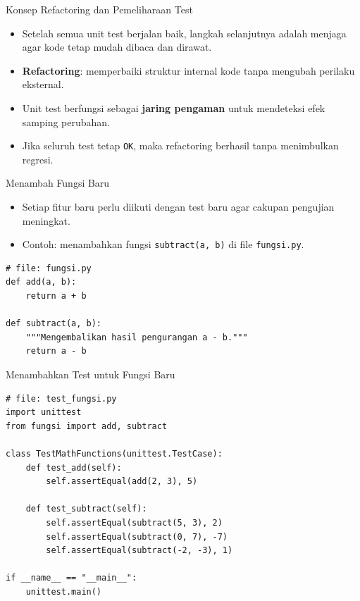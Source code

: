 \documentclass[aspectratio=169, table]{beamer}
\begin{document}
\begin{frame}[fragile]{Konsep Refactoring dan Pemeliharaan Test}
\vspace*{20pt}
\begin{itemize}
  \item Setelah semua unit test berjalan baik, langkah selanjutnya adalah menjaga agar kode tetap mudah dibaca dan dirawat.
  \item \textbf{Refactoring}: memperbaiki struktur internal kode tanpa mengubah perilaku eksternal.
  \item Unit test berfungsi sebagai \textbf{jaring pengaman} untuk mendeteksi efek samping perubahan.
  \item Jika seluruh test tetap \texttt{OK}, maka refactoring berhasil tanpa menimbulkan regresi.
\end{itemize}
\end{frame}

\begin{frame}[fragile]{Menambah Fungsi Baru}
\vspace*{20pt}
\begin{itemize}
  \item Setiap fitur baru perlu diikuti dengan test baru agar cakupan pengujian meningkat.
  \item Contoh: menambahkan fungsi \texttt{subtract(a, b)} di file \texttt{fungsi.py}.
\end{itemize}

\begin{lstlisting}[style=PythonStyle, caption={Fungsi baru: subtract()}]
# file: fungsi.py
def add(a, b):
    return a + b

def subtract(a, b):
    """Mengembalikan hasil pengurangan a - b."""
    return a - b
\end{lstlisting}
\end{frame}

\begin{frame}[fragile]{Menambahkan Test untuk Fungsi Baru}
\vspace*{20pt}
\begin{lstlisting}[style=PythonStyle, caption={Test untuk fungsi add() dan subtract()}]
# file: test_fungsi.py
import unittest
from fungsi import add, subtract

class TestMathFunctions(unittest.TestCase):
    def test_add(self):
        self.assertEqual(add(2, 3), 5)

    def test_subtract(self):
        self.assertEqual(subtract(5, 3), 2)
        self.assertEqual(subtract(0, 7), -7)
        self.assertEqual(subtract(-2, -3), 1)

if __name__ == "__main__":
    unittest.main()
\end{lstlisting}
\end{frame}
\end{document}
